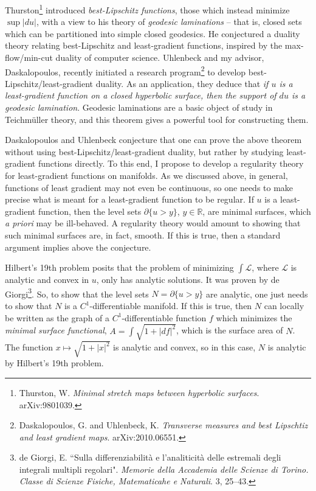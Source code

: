 \documentclass[12pt]{article}
\begin{document}
Thurston\footnote{Thurston, W. \emph{Minimal stretch maps between hyperbolic surfaces}. arXiv:9801039.} introduced \emph{best-Lipschitz functions}, those which instead minimize $\sup |du|$, with a view to his theory of \emph{geodesic laminations} -- that is, closed sets which can be partitioned into simple closed geodesics.
He conjectured a duality theory relating best-Lipschitz and least-gradient functions, inspired by the max-flow/min-cut duality of computer science.
Uhlenbeck and my advisor, Daskalopoulos, recently initiated a research program\footnote{Daskalopoulos, G. and Uhlenbeck, K. \emph{Transverse measures and best Lipschtiz and least gradient maps}. arXiv:2010.06551.} to develop best-Lipschitz/least-gradient duality.
As an application, they deduce that \emph{if $u$ is a least-gradient function on a closed hyperbolic surface, then the support of $du$ is a geodesic lamination}.
Geodesic laminations are a basic object of study in Teichm\"uller theory, and this theorem gives a powerful tool for constructing them.

Daskalopoulos and Uhlenbeck conjecture that one can prove the above theorem without using best-Lipschitz/least-gradient duality, but rather by studying least-gradient functions directly.
To this end, I propose to develop a regularity theory for least-gradient functions on manifolds.
As we discussed above, in general, functions of least gradient may not even be continuous, so one needs to make precise what is meant for a least-gradient function to be regular.
If $u$ is a least-gradient function, then the level sets $\partial \{u > y\}$, $y \in \mathbb R$, are minimal surfaces, which \emph{a priori} may be ill-behaved.
A regularity theory would amount to showing that such minimal surfaces are, in fact, smooth.
If this is true, then a standard argument implies above the conjecture.

Hilbert's 19th problem posits that the problem of minimizing $\int \mathscr L$, where $\mathscr L$ is analytic and convex in $u$, only has analytic solutions.
It was proven by de Giorgi\footnote{de Giorgi, E. ``Sulla differenziabilità e l'analiticità delle estremali degli integrali multipli regolari". \emph{Memorie della Accademia delle Scienze di Torino. Classe di Scienze Fisiche, Matematicahe e Naturali}. 3, 25--43.}.
So, to show that the level sets $N = \partial \{u > y\}$ are analytic, one just needs to show that $N$ is a $C^1$-differentiable manifold.
If this is true, then $N$ can locally be written as the graph of a $C^1$-differentiable function $f$ which minimizes the \emph{minimal surface functional}, $A = \int \sqrt{1 + |df|^2}$, which is the surface area of $N$.
The function $x \mapsto \sqrt{1 + |x|^2}$ is analytic and convex, so in this case, $N$ is analytic by Hilbert's 19th problem.
\end{document}
